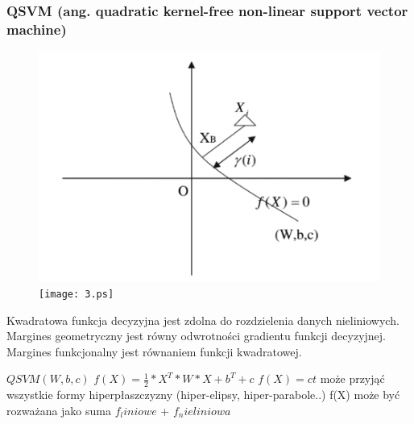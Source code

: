 \documentclass[[10pt,a4paper]{article}
\begin{document}
\begin{enumerate}
\begin{itemize}
\subsubsection{QSVM (ang. quadratic kernel-free non-linear support vector machine)}
\begin{figure}[h] \begin{center} \ifpdf \includegraphics{3.png} \else \texttt{[image: 3.ps]} \fi \end{center} \end{figure}
Kwadratowa funkcja decyzyjna jest zdolna do rozdzielenia danych nieliniowych. 
Margines geometryczny jest równy odwrotności gradientu funkcji decyzyjnej.
Margines funkcjonalny jest równaniem funkcji kwadratowej.


$QSVM (W,b,c)$
$f(X)=\frac{1}{2}*X^T*W*X+b^T+c$
$f(X)=ct$ może przyjąć wszystkie formy hiperpłaszczyzny (hiper-elipsy, hiper-parabole..)
f(X) może być rozważana jako suma $f_liniowe$ + $f_nieliniowa$

\end{itemize}
\end{enumerate}
\end{document}
